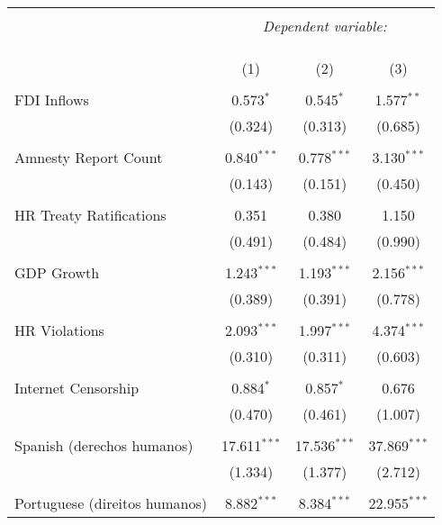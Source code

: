 
\begin{table}[!htbp] \centering 
  \caption{} 
  \label{} 
\begin{tabular}{@{\extracolsep{5pt}}lccc} 
\\[-1.8ex]\hline 
\hline \\[-1.8ex] 
 & \multicolumn{3}{c}{\textit{Dependent variable:}} \\ 
\cline{2-4} 
\\[-1.8ex] & \multicolumn{3}{c}{ } \\ 
\\[-1.8ex] & (1) & (2) & (3)\\ 
\hline \\[-1.8ex] 
 FDI Inflows & 0.573$^{*}$ & 0.545$^{*}$ & 1.577$^{**}$ \\ 
  & (0.324) & (0.313) & (0.685) \\ 
  & & & \\ 
 Amnesty Report Count & 0.840$^{***}$ & 0.778$^{***}$ & 3.130$^{***}$ \\ 
  & (0.143) & (0.151) & (0.450) \\ 
  & & & \\ 
 HR Treaty Ratifications & 0.351 & 0.380 & 1.150 \\ 
  & (0.491) & (0.484) & (0.990) \\ 
  & & & \\ 
 GDP Growth & 1.243$^{***}$ & 1.193$^{***}$ & 2.156$^{***}$ \\ 
  & (0.389) & (0.391) & (0.778) \\ 
  & & & \\ 
 HR Violations & 2.093$^{***}$ & 1.997$^{***}$ & 4.374$^{***}$ \\ 
  & (0.310) & (0.311) & (0.603) \\ 
  & & & \\ 
 Internet Censorship & 0.884$^{*}$ & 0.857$^{*}$ & 0.676 \\ 
  & (0.470) & (0.461) & (1.007) \\ 
  & & & \\ 
 Spanish (derechos humanos) & 17.611$^{***}$ & 17.536$^{***}$ & 37.869$^{***}$ \\ 
  & (1.334) & (1.377) & (2.712) \\ 
  & & & \\ 
 Portuguese (direitos humanos) & 8.882$^{***}$ & 8.384$^{***}$ & 22.955$^{***}$ \\ 

\end{tabular}
\end{table}
